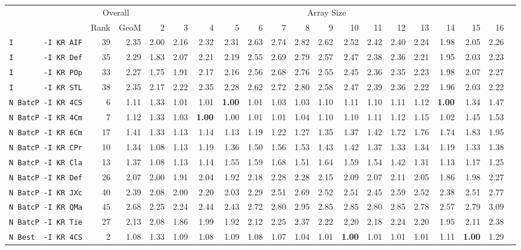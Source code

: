 \begin{tabular}{l | r @{~~} r | r@{~~}r@{~~}r@{~~}r@{~~}r@{~~}r@{~~}r@{~~}r@{~~}r@{~~}r@{~~}r@{~~}r@{~~}r@{~~}r@{~~}r@{~~}r|}
 & \multicolumn{2}{c}{Overall} & \multicolumn{15}{c}{Array Size} \\
 & Rank & GeoM & 2&3&4&5&6&7&8&9&10&11&12&13&14&15&16\\ \hline
\verb+I       -I KR AIF+ & 39 & 2.35 & 2.00&2.16&2.32&2.31&2.63&2.74&2.82&2.62&2.52&2.42&2.40&2.24&1.98&2.05&2.26\\
\verb+I       -I KR Def+ & 35 & 2.29 & 1.83&2.07&2.21&2.19&2.55&2.69&2.79&2.57&2.47&2.38&2.36&2.21&1.95&2.03&2.23\\
\verb+I       -I KR POp+ & 33 & 2.27 & 1.75&1.91&2.17&2.16&2.56&2.68&2.76&2.55&2.45&2.36&2.35&2.23&1.98&2.07&2.27\\
\verb+I       -I KR STL+ & 38 & 2.35 & 2.17&2.22&2.35&2.28&2.62&2.72&2.80&2.58&2.47&2.39&2.36&2.22&1.96&2.03&2.22\\
\verb+N BatcP -I KR 4CS+ & 6 & 1.11 & 1.33&1.01&1.01&\textbf{1.00}&1.01&1.03&1.03&1.10&1.11&1.10&1.11&1.12&\textbf{1.00}&1.34&1.47\\
\verb+N BatcP -I KR 4Cm+ & 7 & 1.12 & 1.33&1.03&\textbf{1.00}&1.00&1.01&1.01&1.04&1.10&1.10&1.11&1.12&1.15&1.02&1.45&1.53\\
\verb+N BatcP -I KR 6Cm+ & 17 & 1.41 & 1.33&1.13&1.14&1.13&1.19&1.22&1.27&1.35&1.37&1.42&1.72&1.76&1.74&1.83&1.95\\
\verb+N BatcP -I KR CPr+ & 10 & 1.34 & 1.08&1.13&1.19&1.36&1.50&1.56&1.53&1.43&1.42&1.37&1.33&1.34&1.19&1.33&1.38\\
\verb+N BatcP -I KR Cla+ & 13 & 1.37 & 1.08&1.13&1.14&1.55&1.59&1.68&1.51&1.64&1.59&1.54&1.42&1.31&1.13&1.17&1.25\\
\verb+N BatcP -I KR Def+ & 26 & 2.07 & 2.00&1.91&2.04&1.92&2.18&2.28&2.28&2.15&2.09&2.07&2.11&2.05&1.86&1.98&2.27\\
\verb+N BatcP -I KR JXc+ & 40 & 2.39 & 2.08&2.00&2.20&2.03&2.29&2.51&2.69&2.52&2.51&2.45&2.59&2.52&2.38&2.51&2.77\\
\verb+N BatcP -I KR QMa+ & 45 & 2.68 & 2.25&2.24&2.44&2.43&2.72&2.80&2.95&2.85&2.85&2.80&2.85&2.78&2.57&2.79&3.09\\
\verb+N BatcP -I KR Tie+ & 27 & 2.13 & 2.08&1.86&1.99&1.92&2.12&2.25&2.37&2.22&2.20&2.18&2.24&2.20&1.95&2.11&2.38\\
\verb+N Best  -I KR 4CS+ & 2 & 1.08 & 1.33&1.09&1.08&1.09&1.08&1.07&1.04&1.01&\textbf{1.00}&1.01&1.01&1.01&1.11&\textbf{1.00}&1.29\\

\end{tabular}
